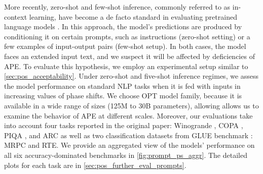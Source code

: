 \documentclass[letterpaper, 12pt]{report}
\begin{document}
More recently, zero-shot and few-shot inference, commonly referred to as in-context learning, have become a de facto standard in evaluating pretrained language models \citep{Brown2020:GPT3}.
In this approach, the model's predictions are produced by conditioning it on certain prompts, such as instructions (zero-shot setting) or a few examples of input-output pairs (few-shot setup).
In both cases, the model faces an extended input text, and we suspect it will be affected by deficiencies of APE.
To evaluate this hypothesis, we employ an experimental setup similar to \autoref{sec:pos_acceptability}.
Under zero-shot and five-shot inference regimes, we assess the model performance on standard NLP tasks when it is fed with inputs in increasing values of phase shifts.
We choose OPT model family, because it is available in a wide range of sizes (125M to 30B parameters), allowing allows us to examine the behavior of APE at different scales.
Moreover, our evaluations take into account four tasks reported in the original paper: Winogrande \citep{Sakaguchi2020:WINOGRANDE}, COPA \citep{Gordon2012:COPA}, PIQA \citep{Bisk2020:PIQA}, and ARC \citep{Clark2018:ARC} as well as two classification datasets from GLUE benchmark \citep{Wang2018:GLUE}: MRPC and RTE.
We provide an aggregated view of the models' performance on all six accuracy-dominated benchmarks in \autoref{fig:prompt_ps_aggr}. The detailed plots for each task are in \autoref{sec:pos_further_eval_prompts}.
\end{document}
